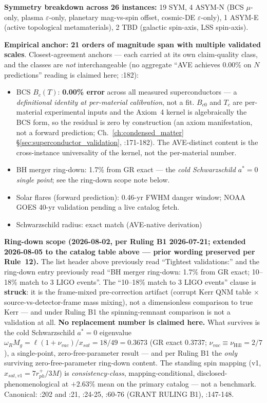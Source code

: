 \textbf{Symmetry breakdown across 26 instances:} 19 SYM, 4 ASYM-N
(BCS $\mu$-only, plasma $\varepsilon$-only, planetary mag-vs-spin offset,
cosmic-DE $\varepsilon$-only), 1 ASYM-E (active topological metamaterials),
2 TBD (galactic spin-axis, LSS spin-axis).

\textbf{Empirical anchor: 21 orders of magnitude span with multiple
validated scales}. Closest-agreement anchors --- each carried at its own
claim-quality class, and the classes are \emph{not} interchangeable
(no aggregate ``AVE achieves 0.00\% on $N$ predictions'' reading is claimed
here; :182):
\begin{itemize}
    \item BCS $B_c(T)$: \textbf{0.00\% error} across all measured superconductors
      --- a \emph{definitional identity at per-material calibration}, not a fit.
      $B_{c0}$ and $T_c$ are per-material experimental inputs and the Axiom~4
      kernel is algebraically the BCS form, so the residual is zero by
      construction (an axiom manifestation, not a forward prediction;
      Ch.~\ref{ch:condensed_matter} \S\ref{sec:superconductor_validation},
      :171-182). The AVE-distinct content is
      the cross-instance universality of the kernel, not the per-material number.
    \item BH merger ring-down: 1.7\% from GR exact --- the \emph{cold
      Schwarzschild $a^{*} = 0$ single point}; see the ring-down scope note below.
    \item Solar flares (forward prediction): 0.46-yr FWHM danger window; NOAA GOES 40-yr validation pending a live catalog fetch.
    \item Schwarzschild radius: exact match (AVE-native derivation)
\end{itemize}

\noindent\textbf{Ring-down scope (2026-08-02, per Ruling B1 2026-07-21;
extended 2026-08-05 to the catalog table above --- prior wording preserved
per Rule~12).} The list header above previously read
``Tightest validations:'' and the ring-down entry previously read ``BH merger
ring-down: 1.7\% from GR exact; 10--18\% match to 3 LIGO events''. The
``10--18\% match to 3 LIGO events'' clause is \textbf{struck}: it is the
frame-mixed pre-correction artifact (corrupt Kerr QNM table $\times$
source-vs-detector-frame mass mixing), not a dimensionless comparison to true
Kerr --- and under Ruling B1 the spinning-remnant comparison is not a
validation at all. \textbf{No replacement number is claimed here.} What
survives is the cold Schwarzschild $a^{*} = 0$ eigenvalue
$\omega_R M_g = \ell(1 + \nu_{vac})/x_{sat} = 18/49 = 0.3673$ (GR exact
$0.3737$; $\nu_{vac} \equiv \nu_\text{Hill} = 2/7$), a single-point,
zero-free-parameter result --- and per Ruling B1 the \emph{only} surviving
zero-free-parameter ring-down content. The standing spin mapping
(v1, $x_{sat,v1} = 7 r_{ph}^{+}/3M$) is \emph{consistency-class},
mapping-conditional, disclosed-phenomenological at $+2.63\%$ mean on the
primary catalog --- not a benchmark. Canonical:
:202 and
:21,
:24-25, :60-76 (GRANT RULING B1), :147-148.

